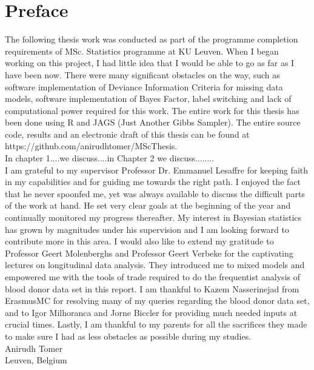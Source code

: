 
\chapter{Preface}
\label{ch : preface}

The following thesis work was conducted as part of the programme completion requirements of MSc. Statistics programme at KU Leuven. When I began working on this project, I had little idea that I would be able to go as far as I have been now. There were many significant obstacles on the way, such as software implementation of Deviance Information Criteria for missing data models, software implementation of Bayes Factor, label switching and lack of computational power required for this work. The entire work for this thesis has been done using R and JAGS (Just Another Gibbs Sampler). The entire source code, results and an electronic draft of this thesis can be found at https://github.com/anirudhtomer/MScThesis.\\

In chapter 1....we discuss....in Chapter 2 we discuss........\\

I am grateful to my supervisor Professor Dr. Emmanuel Lesaffre for keeping faith in my capabilities and for guiding me towards the right path. I enjoyed the fact that he never spoonfed me, yet was always available to discuss the difficult parts of the work at hand. He set very clear goals at the beginning of the year and continually monitored my progress thereafter. My interest in Bayesian statistics has grown by magnitudes under his supervision and I am looking forward to contribute more in this area. I would also like to extend my gratitude to Professor Geert Molenberghs and Professor Geert Verbeke for the captivating lectures on longitudinal data analysis. They introduced me to mixed models and empowered me with the tools of trade required to do the frequentist analysis of blood donor data set in this report. I am thankful to Kazem Nasserinejad from ErasmusMC for resolving many of my queries regarding the blood donor data set, and to Igor Milhoranca and Jorne Biccler for providing much needed inputs at crucial times. Lastly, I am thankful to my parents for all the sacrifices they made to make sure I had as less obstacles as possible during my studies.\\

Anirudh Tomer\\
Leuven, Belgium